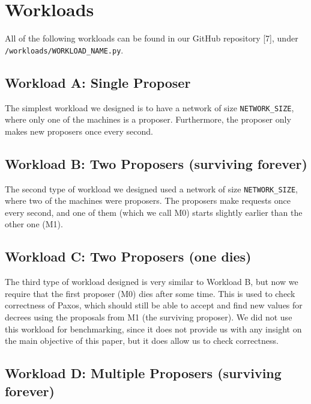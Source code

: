 \documentclass[12pt,]{article}
\begin{document}
\section{Workloads}\label{workloads}

All of the following workloads can be found in our GitHub repository
{[}7{]}, under \texttt{/workloads/WORKLOAD\_NAME.py}.

\subsection{Workload A: Single
Proposer}\label{workload-a-single-proposer}

The simplest workload we designed is to have a network of size
\texttt{NETWORK\_SIZE}, where only one of the machines is a proposer.
Furthermore, the proposer only makes new proposers once every second.

\subsection{Workload B: Two Proposers (surviving
forever)}\label{workload-b-two-proposers-surviving-forever}

The second type of workload we designed used a network of size
\texttt{NETWORK\_SIZE}, where two of the machines were proposers. The
proposers make requests once every second, and one of them (which we
call M0) starts slightly earlier than the other one (M1).

\subsection{Workload C: Two Proposers (one
dies)}\label{workload-c-two-proposers-one-dies}

The third type of workload designed is very similar to Workload B, but
now we require that the first proposer (M0) dies after some time. This
is used to check correctness of Paxos, which should still be able to
accept and find new values for decrees using the proposals from M1 (the
surviving proposer). We did not use this workload for benchmarking,
since it does not provide us with any insight on the main objective of
this paper, but it does allow us to check correctness.

\subsection{Workload D: Multiple Proposers (surviving
forever)}\label{workload-d-multiple-proposers-surviving-forever}
\end{document}
